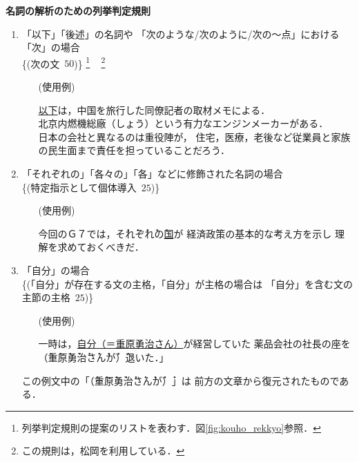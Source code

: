 { {\bf 名詞の解析のための列挙判定規則}
\begin{enumerate}
\item 
  「以下」「後述」の名詞や
  「次のような/次のように/次の〜点」における「次」の場合\\
  \{(次の文 \,$50$)\}
  \footnote{列挙判定規則の提案のリストを表わす．図\ref{fig:kouho_rekkyo}参照．}
  ~ \footnote{
    \label{foot:matsuoka}
    この規則は，松岡\cite{matsuoka_nl}を利用している．}

  \begin{itemize}
  \item[(使用例)]

  \underline{以下}は，中国を旅行した同僚記者の取材メモによる．\\
  北京内燃機総廠（しょう）という有力なエンジンメーカーがある．\\
  日本の会社と異なるのは重役陣が，
  住宅，医療，老後など従業員と家族の民生面まで責任を担っていることだろう．

  \end{itemize}

\item 
  「それぞれの」「各々の」「各」などに修飾された名詞の場合\\
  \{(特定指示として個体導入 \,$25$)\}

  \begin{itemize}
  \item[(使用例)]

  今回のＧ７では，\.そ\.れ\.ぞ\.れ\.の\hspace{-0.2mm}\underline{国}\hspace{-0.2mm}が
  経済政策の基本的な考え方を示し
  理解を求めておくべきだ．

  \end{itemize}

\item 
  「自分」の場合\\
  \{(「自分」が存在する文の主格，「自分」が主格の場合は
  「自分」を含む文の主節の主格 \,$25$)\}

  \begin{itemize}
  \item[(使用例)]

  一時は，\underline{自分（＝重原勇治さん）}が経営していた
  薬品会社の社長の座を\\
  \.（\.重\.原\.勇\.治\.さ\.ん\.が\.）退いた．」

  \end{itemize}

  この例文中の「\.（\.重\.原\.勇\.治\.さ\.ん\.が\.）」は
  前方の文章から復元されたものである．


\end{enumerate}}

